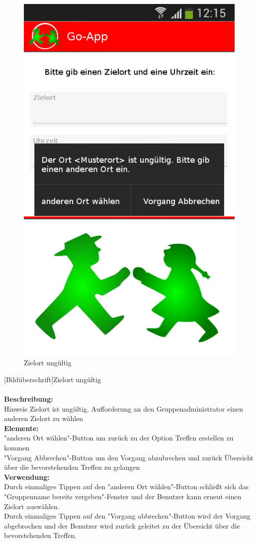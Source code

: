 \begin{figure}[H]
	\caption{Zielort ungültig}
	\includegraphics[scale =0.5]{resources/images/treffpunkt_erstellen_ungueltig_Ort.png}
\end{figure}
[Bildüberschrift]Zielort ungültig\\ \\
\textbf{Beschreibung:}\\
Hinweis Zielort ist ungültig. Aufforderung an den Gruppenadministrator einen anderen Zielort zu wählen\\
\textbf{Elemente:}\\
"anderen Ort wählen"-Button um zurück zu der Option Treffen erstellen zu kommen\\
"Vorgang Abbrechen"-Button um den Vorgang abzubrechen und zurück Übersicht über die bevorstehenden Treffen zu gelangen\\
\textbf{Verwendung:}\\
Durch einmaliges Tippen auf den "anderen Ort wählen"-Button schließt sich das "Gruppenname bereits vergeben"-Fenster und der Benutzer kann erneut einen Zielort auswählen.\\
Durch einmaliges Tippen auf den "Vorgang abbrechen"-Button wird der Vorgang abgebrochen und der Benutzer wird zurück geleitet zu der Übersicht über die bevorstehenden Treffen.\\ \\

